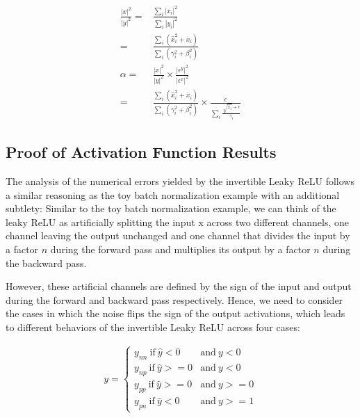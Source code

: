 \documentclass[twocolumn]{bmcart}
\begin{document}
\begin{backmatter}
\begin{subequations}
\begin{align}
\frac{|x|^2}{|y|^2} =& \frac{\sum_i |x_i|^2}{\sum_i|y_i|^2} \\
                    =& \frac{\sum_i (\hat{x}_i^2 + \dot{x_i})}{\sum_i (\gamma_i^2 + \beta_i^2)} \\
\alpha =& \frac{|x|^2}{|y|^2} \times  \frac{|\epsilon^y|^2}{|\epsilon^x|^2}  \\
       =& \frac{\sum_i (\hat{x}_i^2 + \dot{x_i})}{\sum_i (\gamma_i^2 + \beta_i^2)} \times \frac{c}{\sum_i \frac{\sqrt{\dot{x_i}}+\epsilon}{\gamma_i}}
\end{align}
\end{subequations}


\subsection*{Proof of Activation Function Results}

The analysis of the numerical errors yielded by the invertible Leaky ReLU
follows a similar reasoning as the toy batch normalization example with an additional subtlety:
Similar to the toy batch normalization example,
we can think of the leaky ReLU as artificially splitting the input x across two different channels,
one channel leaving the output unchanged and one channel that divides the input by a factor $n$
during the forward pass and multiplies its output by a factor $n$ during the backward pass.

However, these artificial channels are defined by the sign of the input and output during the forward and backward pass respectively.
Hence, we need to consider the cases in which the noise flips the sign of the output activations,
which leads to different behaviors of the invertible Leaky ReLU across four cases:

\begin{subequations}
\begin{align}
y = \begin{cases}
y_{nn} \  \text{if}\  \hat{y}<0    &\text{and}\  y<0  \\
y_{np} \  \text{if}\  \hat{y}>=0   &\text{and}\  y<0  \\
y_{pp} \  \text{if}\  \hat{y}>=0   &\text{and}\  y>=0 \\
y_{pn} \  \text{if}\  \hat{y}<0    &\text{and}\  y>=1
\end{cases}
\end{align}
\end{subequations}


\end{backmatter}
\end{document}
